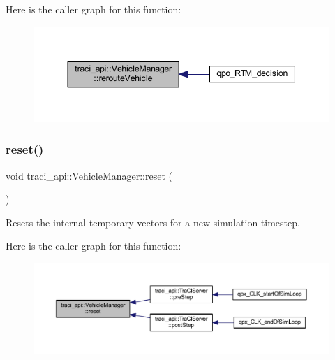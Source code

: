 Here is the caller graph for this function\+:\nopagebreak
\begin{figure}[H]
\begin{center}
\leavevmode
\includegraphics[width=344pt]{classtraci__api_1_1_vehicle_manager_a47a471305d82ae97f65ac2c90f384baa_icgraph}
\end{center}
\end{figure}
\mbox{\label{classtraci__api_1_1_vehicle_manager_abbf990fe432a286e4d3889ff3b3491df}} 
\subsubsection{\texorpdfstring{reset()}{reset()}}
{\footnotesize\ttfamily void traci\+\_\+api\+::\+Vehicle\+Manager\+::reset (\begin{DoxyParamCaption}{ }\end{DoxyParamCaption})}



Resets the internal temporary vectors for a new simulation timestep. 

Here is the caller graph for this function\+:\nopagebreak
\begin{figure}[H]
\begin{center}
\leavevmode
\includegraphics[width=350pt]{classtraci__api_1_1_vehicle_manager_abbf990fe432a286e4d3889ff3b3491df_icgraph}
\end{center}
\end{figure}
\mbox{\label{classtraci__api_1_1_vehicle_manager_a02bcdc3429c0b027345148d9f5824554}} 
